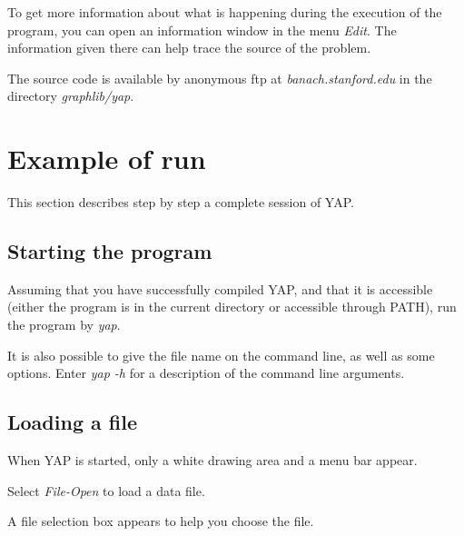 To get more information about what is happening during the execution
of the program, you can open an information window in the menu {\em Edit}.
The information given there can help trace the source of the
problem.

The source code is available by anonymous ftp at {\em banach.stanford.edu}
in the directory {\em graphlib/yap}.

\clearpage




\chapter{Example of run}

This section describes step by step a complete session of YAP.

\section{Starting the program}

Assuming that you have successfully compiled YAP, and that it is accessible
(either the program is in the current directory or accessible through PATH),
run the program by {\em yap}.

It is also possible to give the file name on
the command line, as well as some options. Enter {\em yap -h} for a description
of the command line arguments.

\section{Loading a file}

When YAP is started, only a white drawing area and a menu bar appear. \\
\vspace{33pt}

\clearpage
Select {\em File-Open} to load a data file.

A file selection box appears to help you choose the file.\\
\vspace{377pt}

